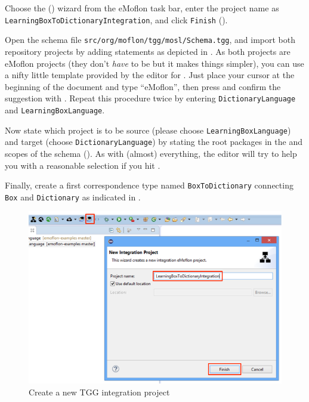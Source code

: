 \begin{stepbystep}

\item Choose the  (\eMoflonCreateNewIntegrationProjectIcon) wizard from the eMoflon task bar, enter the project name as
\texttt{Learning\-Box\-To\-Dictionary\-In\-te\-gra\-tion}, and click \texttt{Finish} ().

\item Open the schema file \texttt{src/org/moflon/tgg/mosl/Schema.tgg}, and import both repository projects by adding  statements as depicted in .
As both projects are eMoflon projects (they don't \emph{have} to be but it makes things simpler), you can use a nifty little template provided by the editor for .
Just place your cursor at the beginning of the document and type \enquote{eMoflon}, then press  and confirm the suggestion with .
Repeat this procedure twice by entering \texttt{Dict\-io\-nary\-Lang\-uage} and \texttt{Lear\-ning\-Box\-Language}.

\item Now state which project is to be source (please choose \texttt{Learning\-Box\-Language}) and target (choose \texttt{Dictionary\-Language}) by stating the root packages in the  and  scopes of the schema ().
As with (almost) everything, the editor will try to help you with a reasonable selection if you hit . 

\item Finally, create a first correspondence type named \texttt{BoxToDictionary} connecting \texttt{Box} and \texttt{Dictionary} as indicated in .
\end{stepbystep}

\begin{figure}[htbp]
\begin{center}
  \includegraphics[width=\textwidth]{newIntegrationProject}
  \caption{Create a new TGG integration project}  
  \label{intgPackage}
\end{center}
\end{figure}

